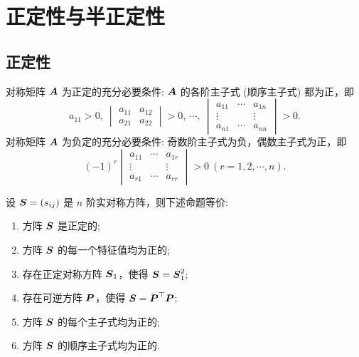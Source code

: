 \section{正定性与半正定性}

\subsection{正定性}

\begin{theorem}[Hurwitz 定理]
    对称矩阵 $\vb*{A}$ 为正定的充分必要条件: $\vb*{A}$ 的各阶主子式 (顺序主子式) 都为正，即
    $$a_{11}>0,~\begin{vmatrix}
            a_{11} & a_{12} \\
            a_{21} & a_{22}
        \end{vmatrix}>0,~\cdots,~\begin{vmatrix}
            a_{11} & \cdots & a_{1n}  \\
            \vdots &        & \vdots\ \\
            a_{n1} & \cdots & a_{nn}
        \end{vmatrix}>0.$$
    对称矩阵 $\vb*{A}$  为负定的充分必要条件: 奇数阶主子式为负，偶数主子式为正，即
    $$(-1)^r\begin{vmatrix}
            a_{11} & \cdots & a_{1r} \\
            \vdots &        & \vdots \\
            a_{r1} & \cdots & a_{rr}
        \end{vmatrix}>0~  (r=1,2,\cdots ,n).$$
    \label{Hurwitztheorem}
\end{theorem}

\begin{theorem}[实对称方阵的等价命题]
    设 $\vb*{S}=(s_{ij})$ 是 $n$ 阶实对称方阵，则下述命题等价:
    \begin{enumerate}[label=(\arabic{*})]
        \item 方阵 $\vb*{S}$ 是正定的;
        \item 方阵 $\vb*{S}$ 的每一个特征值均为正的;
        \item 存在正定对称方阵 $\vb*{S}_1$，使得 $\vb*{S}=\vb*{S}_1^2$;
        \item 存在可逆方阵 $\vb*{P}$，使得 $\vb*{S}=\vb*{P}^\top\vb*{P}$;
        \item 方阵 $\vb*{S}$ 的每个主子式均为正的;
        \item 方阵 $\vb*{S}$ 的顺序主子式均为正的.
    \end{enumerate}
\end{theorem}

